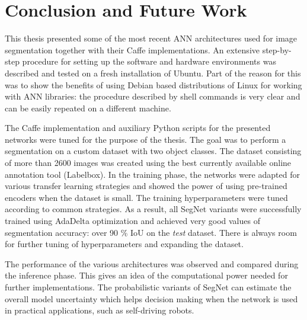 \clearpage
\chapter{Conclusion and Future Work}

This thesis presented some of the most recent ANN architectures used for image segmentation together with their Caffe implementations. An extensive step-by-step procedure for setting up the software and hardware environments was described and tested on a fresh installation of Ubuntu. Part of the reason for this was to show the benefits of using Debian based distributions of Linux for working with ANN libraries: the procedure described by shell commands is very clear and can be easily repeated on a different machine. 

The Caffe implementation and auxiliary Python scripts for the presented networks were tuned for the purpose of the thesis. The goal was to perform a segmentation on a custom dataset with two object classes. The dataset consisting of more than 2600 images was created using the best currently available online annotation tool (Labelbox). In the training phase, the networks were adapted for various transfer learning strategies and showed the power of using pre-trained encoders when the dataset is small. The training hyperparameters were tuned according to common strategies. As a result, all SegNet variants were successfully trained using AdaDelta optimization and achieved very good values of segmentation accuracy: over 90 \% IoU on the \textit{test} dataset. There is always room for further tuning of hyperparameters and expanding the dataset.

The performance of the various architectures was observed and compared during the inference phase. This gives an idea of the computational power needed for further implementations. The probabilistic variants of SegNet can estimate the overall model uncertainty which helps decision making when the network is used in practical applications, such as self-driving robots.
